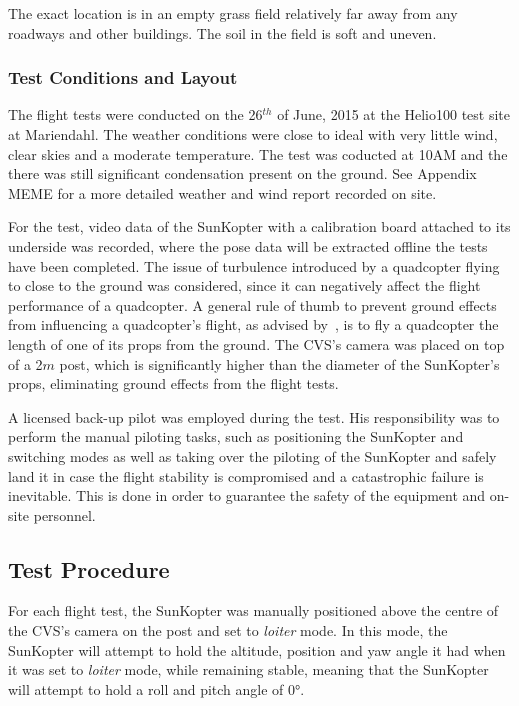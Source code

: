 The exact location is in an empty grass field relatively far away from any roadways and other buildings. The soil in the field is soft and uneven. 

\subsubsection{Test Conditions and Layout}

The flight tests were conducted on the 26$^{th}$ of June, 2015 at the Helio100 test site at Mariendahl. The weather conditions were close to ideal with very little wind, clear skies and a moderate temperature. The test was coducted at 10AM and the there was still significant condensation present on the ground. See Appendix MEME for a more detailed weather and wind report recorded on site.

For the test, video data of the SunKopter with a calibration board attached to its underside was recorded, where the pose data will be extracted offline the tests have been completed. The issue of turbulence introduced by a quadcopter flying to close to the ground was considered, since it can negatively affect the flight performance of a quadcopter. A general rule of thumb to prevent ground effects from influencing a quadcopter's flight, as advised by~\cite{basson-flight-test}, is to fly a quadcopter the length of one of its props from the ground. The CVS's camera was placed on top of a 2$m$ post, which is significantly higher than the diameter of the SunKopter's props, eliminating ground effects from the flight tests.

A licensed back-up pilot was employed during the test. His responsibility was to perform the manual piloting tasks, such as positioning the SunKopter and switching modes as well as taking over the piloting of the SunKopter and safely land it in case the flight stability is compromised and a catastrophic failure is inevitable. This is done in order to guarantee the safety of the equipment and on-site personnel. 

\subsection{Test Procedure}

For each flight test, the SunKopter was manually positioned above the centre of the CVS's camera on the post and set to \emph{loiter} mode. In this mode, the SunKopter will attempt to hold the altitude, position and yaw angle it had when it was set to \emph{loiter} mode, while remaining stable, meaning that the SunKopter will attempt to hold a roll and pitch angle of $\ang{0}$. 

